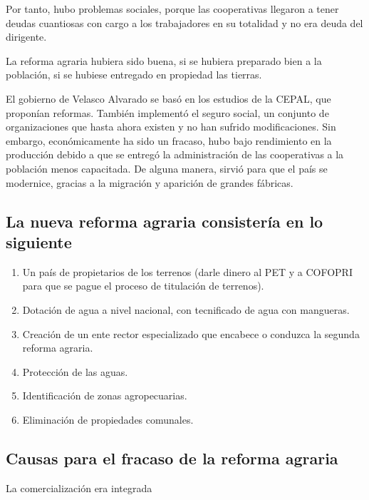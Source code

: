 \documentclass[
  a4paper,
]{article}
\begin{document}
Por tanto, hubo problemas sociales, porque las cooperativas llegaron a
tener deudas cuantiosas con cargo a los trabajadores en su totalidad y
no era deuda del dirigente.

La reforma agraria hubiera sido buena, si se hubiera preparado bien a la
población, si se hubiese entregado en propiedad las tierras.

El gobierno de Velasco Alvarado se basó en los estudios de la CEPAL, que
proponían reformas. También implementó el seguro social, un conjunto de
organizaciones que hasta ahora existen y no han sufrido modificaciones.
Sin embargo, económicamente ha sido un fracaso, hubo bajo rendimiento en
la producción debido a que se entregó la administración de las
cooperativas a la población menos capacitada. De alguna manera, sirvió
para que el país se modernice, gracias a la migración y aparición de
grandes fábricas.

\hypertarget{la-nueva-reforma-agraria-consisteruxeda-en-lo-siguiente}{%
\subsection{La nueva reforma agraria consistería en lo
siguiente}\label{la-nueva-reforma-agraria-consisteruxeda-en-lo-siguiente}}

\begin{enumerate}
\def\labelenumi{\arabic{enumi}.}
\item
  Un país de propietarios de los terrenos (darle dinero al PET y a
  COFOPRI para que se pague el proceso de titulación de terrenos).
\item
  Dotación de agua a nivel nacional, con tecnificado de agua con
  mangueras.
\item
  Creación de un ente rector especializado que encabece o conduzca la
  segunda reforma agraria.
\item
  Protección de las aguas.
\item
  Identificación de zonas agropecuarias.
\item
  Eliminación de propiedades comunales.
\end{enumerate}

\hypertarget{causas-para-el-fracaso-de-la-reforma-agraria}{%
\subsection{Causas para el fracaso de la reforma
agraria}\label{causas-para-el-fracaso-de-la-reforma-agraria}}

La comercialización era integrada
\end{document}
